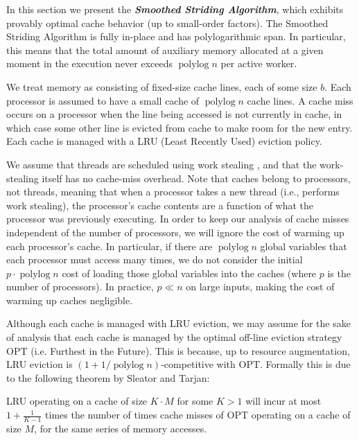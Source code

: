 \documentclass[twoside,leqno,twocolumn]{article}
\newcommand{\polylog}{\operatorname{polylog}}
\newcommand{\defn}[1]{{\textit{\textbf{\boldmath #1}}}}
\renewcommand{\paragraph}[1]{\vspace{0.09in}\noindent{\bf \boldmath #1.}}
\begin{document}

In this section we present the \defn{Smoothed Striding Algorithm},
which exhibits provably optimal cache behavior (up to small-order
factors). The Smoothed Striding Algorithm is fully in-place and has
polylogarithmic span. In particular, this means that the total amount
of auxiliary memory allocated at a given moment in the execution never
exceeds $\polylog n$ per active worker.



\paragraph{Modeling Cache Misses}
We treat memory as consisting of fixed-size cache lines, each of some
size $b$. Each processor is assumed to have a small cache of
$\operatorname{polylog}{n}$ cache lines.  A cache miss occurs on a
processor when the line being accessed is not currently in cache, in
which case some other line is evicted from cache to make room for the
new entry.  Each cache is managed with a LRU (Least Recently Used)
eviction policy.

We assume that threads are scheduled using work stealing \cite{AcarBl00},
and that the work-stealing itself has no cache-miss overhead. Note
that caches belong to processors, not threads, meaning that when a
processor takes a new thread (i.e., performs work stealing), the
processor's cache contents are a function of what the processor was
previously executing. In order to keep our analysis of cache misses
independent of the number of processors, we will ignore the cost of
warming up each processor's cache. In particular, if there are
$\polylog n$ global variables that each processor must access many
times, we do not consider the initial $p \cdot \polylog n$ cost of
loading those global variables into the caches (where $p$ is the
number of processors). In practice, $p \ll n$ on large inputs, making
the cost of warming up caches negligible.

Although each cache is managed with LRU eviction, we may assume
for the sake of analysis that each cache is managed by the optimal
off-line eviction strategy OPT (i.e. Furthest in the Future). This is
because, up to resource augmentation, LRU eviction is $(1 + 1/\polylog
n)$-competitive with OPT. Formally this is due to the following
theorem by Sleator and Tarjan:
\begin{theorem}
  LRU operating on a cache of size $K\cdot M$ for some $K>1$ will incur at most
  $1+\frac{1}{K-1}$ times the number of times cache misses of OPT operating on
  a cache of size $M$, for the same series of memory accesses.
  \label{thm:augmentation}
\end{theorem}
\end{document}
